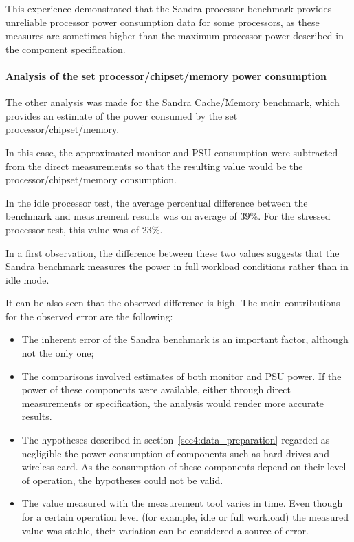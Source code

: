                 This experience demonstrated that the Sandra processor benchmark provides unreliable processor power consumption data for some processors, as these measures are sometimes higher than the maximum processor power described in the component specification.
                
            \paragraph*{Analysis of the set processor/chipset/memory power consumption}
                The other analysis was made for the Sandra Cache/Memory benchmark, which provides an estimate of the power consumed by the set processor/chipset/memory.
                
                In this case, the approximated monitor and PSU consumption were subtracted from the direct measurements so that the resulting value would be the processor/chipset/memory consumption.
                
                In the idle processor test, the average percentual difference between the benchmark and measurement results was on average of 39\%. For the stressed processor test, this value was of 23\%.
                
                In a first observation, the difference between these two values suggests that the Sandra benchmark measures the power in full workload conditions rather than in idle mode.
                
                It can be also seen that the observed difference is high. The main contributions for the observed error are the following:
                
                \begin{itemize}
                    \item The inherent error of the Sandra benchmark is an important factor, although not the only one;
                    \item The comparisons involved estimates of both monitor and PSU power. If the power of these components were available, either through direct measurements or specification, the analysis would render more accurate results.
                    \item The hypotheses described in section~\ref{sec4:data_preparation} regarded as negligible the power consumption of components such as hard drives and wireless card. As the consumption of these components depend on their level of operation, the hypotheses could not be valid.
                    \item The value measured with the measurement tool varies in time. Even though for a certain operation level (for example, idle or full workload) the measured value was stable, their variation can be considered a source of error.
                \end{itemize}
            
